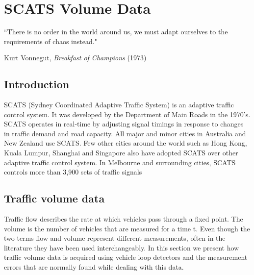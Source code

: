 
\chapter{SCATS Volume Data} %

\label{Chapter3}


``There is no order in the world around us, we must adapt ourselves to the requirements of chaos
instead."

\begin{flushright}
Kurt Vonnegut, \textit{Breakfast of Champions} (1973)
\end{flushright}

\section{Introduction}
SCATS (Sydney Coordinated Adaptive Traffic System) is an adaptive traffic control system. It was
developed by the Department of Main Roads in the 1970's. SCATS operates in real-time by adjusting
signal timings in response to changes in traffic demand and road capacity. All major and minor
cities in Australia and New Zealand use SCATS. Few other cities around the world such as Hong
Kong, Kuala Lumpur, Shanghai and Singapore also have adopted SCATS over other adaptive traffic
control system. In Melbourne and surrounding cities, SCATS controls more than 3,900 sets of traffic
signals


\section{Traffic volume data}
Traffic flow describes the rate at which vehicles pass through a fixed point. The volume is the number
of vehicles that are measured for a time t. Even though the two terms flow and volume represent different
measurements, often in the literature they have been used interchangeably. In this section we present
how traffic volume data is acquired using vehicle loop detectors and the measurement errors that are
normally found while dealing with this data.

